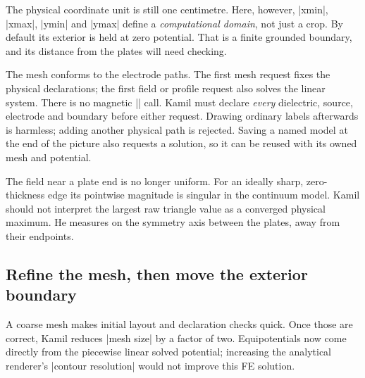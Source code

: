 The physical coordinate unit is still one centimetre. Here, however, |xmin|,
|xmax|, |ymin| and |ymax| define a \emph{computational domain}, not just a crop.
By default its exterior is held at zero potential. That is a finite grounded
boundary, and its distance from the plates will need checking.

\begin{codeexample}[width=0pt]
\end{codeexample}

The mesh conforms to the electrode paths. The first mesh request fixes the
physical declarations; the first field or profile request also solves the
linear system. There is no magnetic |\femmsolve| call. Kamil must declare
\emph{every} dielectric, source, electrode and boundary before either request.
Drawing ordinary labels afterwards is harmless; adding another physical path
is rejected. Saving a named model at the end of the picture also requests a
solution, so it can be reused with its owned mesh and potential.

The field near a plate end is no longer uniform. For an ideally sharp,
zero-thickness edge its pointwise magnitude is singular in the continuum
model. Kamil should not interpret the largest raw triangle value as a converged
physical maximum. He measures on the symmetry axis between the plates,
away from their endpoints.

\subsection{Refine the mesh, then move the exterior boundary}
A coarse mesh makes initial layout and declaration checks quick. Once those
are correct, Kamil reduces |mesh size| by a factor of two. Equipotentials now
come directly from the piecewise linear solved potential; increasing the
analytical renderer's |contour resolution| would not improve this FE solution.

